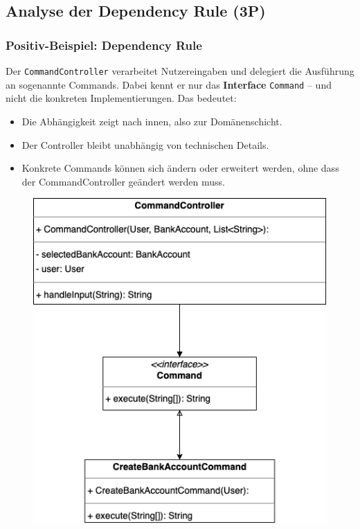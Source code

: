 \subsection{Analyse der Dependency Rule (3P)}

\subsubsection*{Positiv-Beispiel: Dependency Rule}
Der \texttt{CommandController} verarbeitet Nutzereingaben und delegiert die Ausführung an sogenannte Commands. Dabei kennt er nur das \textbf{Interface} \texttt{Command} – und nicht die konkreten Implementierungen. Das bedeutet:
\begin{itemize}
    \item Die Abhängigkeit zeigt nach innen, also zur Domänenschicht.
    \item Der Controller bleibt unabhängig von technischen Details.
    \item Konkrete Commands können sich ändern oder erweitert werden, ohne dass der CommandController geändert werden muss.
\end{itemize}

\begin{figure}[htbp]
    \centering
    \includegraphics[width=0.7\linewidth]{kapitel2_architektur/DepRulPos.png}
\end{figure}


